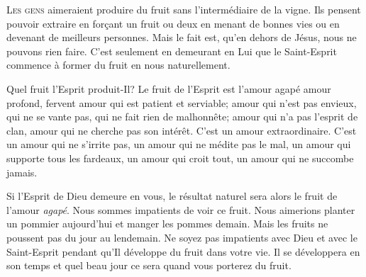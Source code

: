 \dvrule







\lettrine{L}{es gens} aimeraient produire du fruit
 sans l'intermédiaire de la vigne. Ils pensent pouvoir extraire
 en for\c{c}ant un fruit ou deux en menant de bonnes vies ou en devenant
 de meilleurs personnes. Mais le fait est, qu'en dehors de Jésus,
 nous ne pouvons rien faire. C'est seulement en demeurant en Lui
 que le Saint-Esprit commence à former du fruit en nous \ocadr naturellement.

Quel fruit l'Esprit produit-Il? Le fruit de l'Esprit est l'amour
 \Og agapé \Fg{} \ocadr amour profond, fervent \fcadr{} amour qui est patient
 et serviable; amour qui n'est pas envieux, qui ne se vante pas,
 qui ne fait rien de malhonnête; amour qui n'a pas l'esprit de clan,
 amour qui ne cherche pas son intérêt. C'est un amour extraordinaire.
 C'est un amour qui ne s'irrite pas, un amour qui ne médite pas le mal,
 un amour qui supporte tous les fardeaux, un amour qui croit tout,
 un amour qui ne succombe jamais.


Si l'Esprit de Dieu demeure en vous, le résultat naturel sera alors
 le fruit de l'amour \emph{agapé}.
 Nous sommes impatients de voir ce fruit.
 Nous aimerions planter un pommier aujourd'hui et manger les pommes demain.
 Mais les fruits ne poussent pas du jour au lendemain.
 Ne soyez pas impatients avec Dieu et avec le Saint-Esprit pendant
 qu'Il développe du fruit dans votre vie.
 Il se développera en son temps
 \ocadr et quel beau jour ce sera quand vous porterez du fruit.

